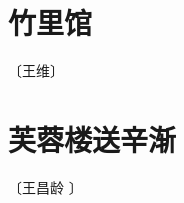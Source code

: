 \documentclass[12pt,UTF-8,openany]{ctexbook}
\begin{document}
\vspace{8pt}


\section{竹里馆}

\begin{center}
    \vspace{10pt}
    
    \begin{normalsize}
        
        〔王维〕
        
    \end{normalsize}
    
    \vspace{8pt}
    
    \begin{large}
        
        
        
    \end{large}
    
\end{center}

\vspace{8pt}


\section{芙蓉楼送辛渐}

\begin{center}
    \vspace{10pt}
    
    \begin{normalsize}
        
        〔王昌龄 〕
        
    \end{normalsize}
    
    \vspace{8pt}
    
    \begin{large}
        
        
        
    \end{large}
    
\end{center}
\end{document}
